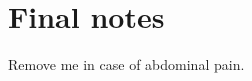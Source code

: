 \documentclass[12pt,chapterheads]{ucsd}
\begin{document}
\appendix
\chapter{Final notes}
  Remove me in case of abdominal pain.





\printindex %
\end{document}
